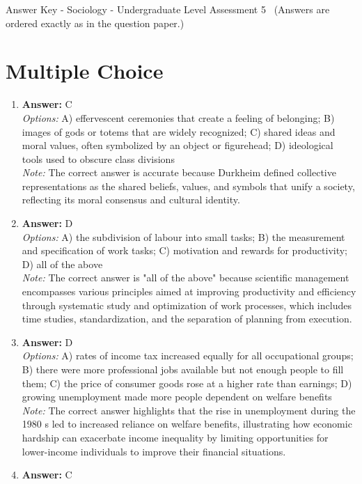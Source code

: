 \documentclass[12pt]{article}
\begin{document}
\begin{center}
Answer Key - Sociology - Undergraduate Level Assessment 5 \
\small (Answers are ordered exactly as in the question paper.)
\end{center}

\section*{Multiple Choice}
\begin{enumerate}[label=\arabic*.]
\item \textbf{Answer:} C
\\ \textit{Options:} A) effervescent ceremonies that create a feeling of belonging; B) images of gods or totems that are widely recognized; C) shared ideas and moral values, often symbolized by an object or figurehead; D) ideological tools used to obscure class divisions
\\ \textit{Note:} The correct answer is accurate because Durkheim defined collective representations as the shared beliefs, values, and symbols that unify a society, reflecting its moral consensus and cultural identity.
\item \textbf{Answer:} D
\\ \textit{Options:} A) the subdivision of labour into small tasks; B) the measurement and specification of work tasks; C) motivation and rewards for productivity; D) all of the above
\\ \textit{Note:} The correct answer is "all of the above" because scientific management encompasses various principles aimed at improving productivity and efficiency through systematic study and optimization of work processes, which includes time studies, standardization, and the separation of planning from execution.
\item \textbf{Answer:} D
\\ \textit{Options:} A) rates of income tax increased equally for all occupational groups; B) there were more professional jobs available but not enough people to fill them; C) the price of consumer goods rose at a higher rate than earnings; D) growing unemployment made more people dependent on welfare benefits
\\ \textit{Note:} The correct answer highlights that the rise in unemployment during the 1980 s led to increased reliance on welfare benefits, illustrating how economic hardship can exacerbate income inequality by limiting opportunities for lower-income individuals to improve their financial situations.
\item \textbf{Answer:} C

\end{enumerate}
\end{document}
